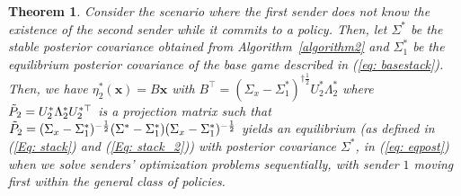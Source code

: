 \documentclass[12pt,journal,onecolumn]{IEEEtran}
\newtheorem{theorem}{Theorem}
\begin{document}
\begin{theorem}\label{th: seqcommit}
Consider the scenario where the first sender does not know the existence of the second sender while it commits to a policy. Then, let $\Sigma^*$ be the stable posterior covariance obtained from Algorithm~\ref{algorithm2} and $\Sigma_1^*$ be the equilibrium posterior covariance of the base game described in (\ref{eq: basestack}). Then, we have $\eta_{2}^*(\boldsymbol{x})=B\boldsymbol{x}$ with $B^\top=(\Sigma_x-\Sigma_{1}^*)^{\dagger\frac{1}{2}}U_{2}^*\Lambda_{2}^*$ where $\Tilde{P}_{2}=U_{2}^*\Lambda_{2}^*U_{2}^{*\top}$ is a projection matrix such that
$\Tilde{P}_{2}=(\Sigma_x-\Sigma_1^*)^{-\frac{1}{2}}(\Sigma^*-\Sigma_1^*)(\Sigma_x-\Sigma_1^*)^{-\frac{1}{2}}$ yields an equilibrium (as defined in (\ref{Eq: stack}) and (\ref{Eq: stack_2})) with posterior covariance $\Sigma^*$, in (\ref{eq: eqpost}) when we solve senders' optimization problems sequentially, with sender $1$ moving first within the general class of policies.
\end{theorem}
\end{document}
